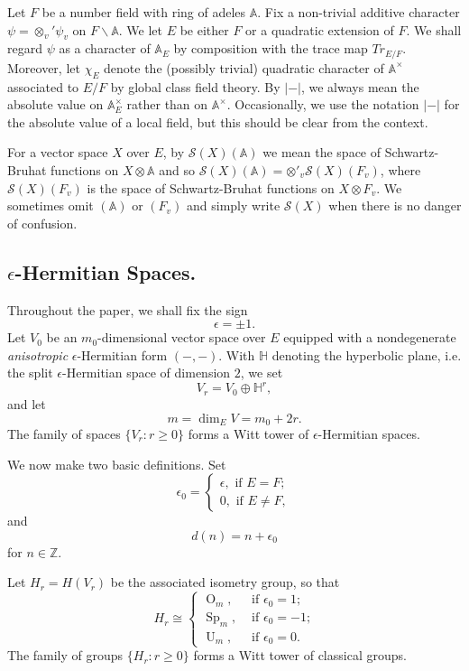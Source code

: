 \documentclass[10pt]{amsart}
\theoremstyle{plain}
\numberwithin{equation}{section}
\begin{document}
 Let $F$ be a number field with  ring of adeles ${\mathbb{A}}$. Fix a
 non-trivial additive character $\psi=\otimes_v'\psi_v$ on
 $F\backslash {\mathbb{A}}$.  We let $E$ be either $F$ or a quadratic extension of $F$.
We shall regard $\psi$ as a character of ${\mathbb{A}}_E$ by composition with the trace map $Tr_{E/F}$. 
Moreover, let $\chi_E$ denote the (possibly trivial) quadratic
character of ${\mathbb{A}}^{\times}$ associated to $E/F$ by global class field
theory. By $|-|$, we always mean the absolute value on
${\mathbb{A}}^{\times}_E$ rather than on ${\mathbb{A}}^\times$. Occasionally, we use
the notation $|-|$ for the absolute value of a local field, but this should be 
 clear from the context. 
\vskip 5pt

For a vector space $X$ over $E$, by $\mathcal{S}(X)({\mathbb{A}})$ we mean the
space of Schwartz-Bruhat functions on $X\otimes {\mathbb{A}}$ and so
$\mathcal{S}(X)({\mathbb{A}})=\otimes'_v\mathcal{S}(X)(F_v)$, where
$\mathcal{S}(X)(F_v)$ is the space of Schwartz-Bruhat functions on
$X\otimes F_v$. We sometimes omit $({\mathbb{A}})$ or $(F_v)$ and simply write
$\mathcal{S}(X)$ when there is no danger of confusion.
 
\vskip 5pt

\subsection{\bf $\epsilon$-Hermitian Spaces.}
Throughout the paper, we shall fix the sign
\[  
\epsilon = \pm 1. 
\]
Let $V_0$ be an $m_0$-dimensional vector space over $E$ equipped with
a nondegenerate {\em anisotropic}  $\epsilon$-Hermitian form $(-,-)$.  
With $\mathbb{H}$ denoting the hyperbolic plane, i.e. the split
$\epsilon$-Hermitian space of dimension $2$, we set  
\[  V_r =  V_0 \oplus \mathbb{H}^r,\]
and let 
\[  m =  \dim_E V = m_0 + 2r. \]
The family of spaces $\{ V_r:  r \geq 0\}$ forms a Witt tower of $\epsilon$-Hermitian spaces. 
\vskip 5pt

We now make two basic definitions. Set
\[  \epsilon_0 = \begin{cases}
\epsilon, \text{  if $E = F$;} \\
 0, \text{  if $E \ne F$}, \end{cases} \] 
 and
\[  d(n)  = n + \epsilon_0 \]    
 for $n \in {\mathbb{Z}}$.
 \vskip 5pt

Let $H_r  = H(V_r)$ be the associated isometry group, so that
\[  H_r \cong \begin{cases}
{\operatorname{O}}_m, &\text{  if $\epsilon_0 = 1$;} \\
{\operatorname{Sp}}_m, &\text{  if $\epsilon_0= -1$;} \\
{\operatorname{U}}_m, &\text{  if $\epsilon_0 = 0$.} \end{cases} \]
The family of groups $\{  H_r: r \geq 0\}$ forms a Witt tower of classical groups.  
\vskip 5pt
\end{document}
